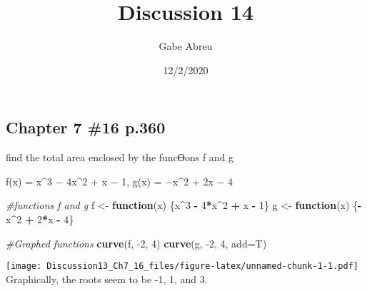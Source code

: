 \documentclass[
]{article}
\title{Discussion 14}
\author{Gabe Abreu}
\date{12/2/2020}
\newenvironment{Shaded}{\begin{snugshade}}{\end{snugshade}}
\newcommand{\CommentTok}[1]{\textcolor[rgb]{0.56,0.35,0.01}{\textit{#1}}}
\newcommand{\ControlFlowTok}[1]{\textcolor[rgb]{0.13,0.29,0.53}{\textbf{#1}}}
\newcommand{\DataTypeTok}[1]{\textcolor[rgb]{0.13,0.29,0.53}{#1}}
\newcommand{\DecValTok}[1]{\textcolor[rgb]{0.00,0.00,0.81}{#1}}
\newcommand{\KeywordTok}[1]{\textcolor[rgb]{0.13,0.29,0.53}{\textbf{#1}}}
\newcommand{\NormalTok}[1]{#1}
\newcommand{\OperatorTok}[1]{\textcolor[rgb]{0.81,0.36,0.00}{\textbf{#1}}}
\newcommand{\StringTok}[1]{\textcolor[rgb]{0.31,0.60,0.02}{#1}}
\begin{document}
\maketitle

\hypertarget{chapter-7-16-p.360}{%
\subsection{Chapter 7 \#16 p.360}\label{chapter-7-16-p.360}}

find the total area enclosed by the funcƟons f and g

f(x) = x\^{}3 − 4x\^{}2 + x − 1, g(x) = −x\^{}2 + 2x − 4

\begin{Shaded}
\begin{Highlighting}[]
\CommentTok{#functions f and g }
\NormalTok{f <-}\StringTok{ }\ControlFlowTok{function}\NormalTok{(x) \{x}\OperatorTok{^}\DecValTok{3} \OperatorTok{-}\StringTok{ }\DecValTok{4}\OperatorTok{*}\NormalTok{x}\OperatorTok{^}\DecValTok{2} \OperatorTok{+}\StringTok{ }\NormalTok{x }\OperatorTok{-}\StringTok{ }\DecValTok{1}\NormalTok{\}}
\NormalTok{g <-}\StringTok{ }\ControlFlowTok{function}\NormalTok{(x) \{}\OperatorTok{-}\NormalTok{x}\OperatorTok{^}\DecValTok{2} \OperatorTok{+}\StringTok{ }\DecValTok{2}\OperatorTok{*}\NormalTok{x }\OperatorTok{-}\StringTok{ }\DecValTok{4}\NormalTok{\}}


\CommentTok{#Graphed functions }
\KeywordTok{curve}\NormalTok{(f, }\DecValTok{-2}\NormalTok{, }\DecValTok{4}\NormalTok{)}
\KeywordTok{curve}\NormalTok{(g, }\DecValTok{-2}\NormalTok{, }\DecValTok{4}\NormalTok{, }\DataTypeTok{add=}\NormalTok{T)}
\end{Highlighting}
\end{Shaded}

\texttt{[image: Discussion13\_Ch7\_16\_files/figure-latex/unnamed-chunk-1-1.pdf]}
Graphically, the roots seem to be -1, 1, and 3.

\begin{Shaded}
\end{Shaded}
\end{document}
